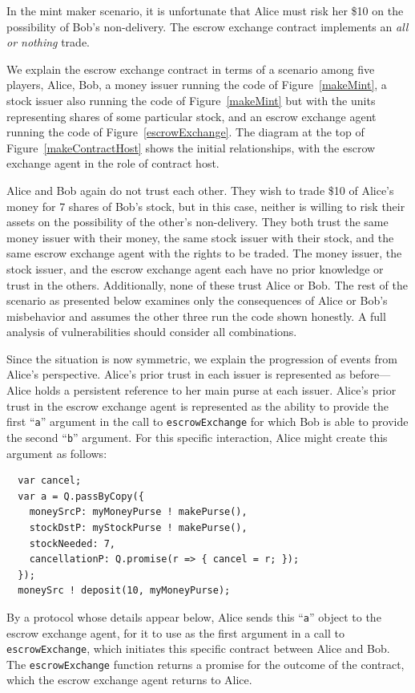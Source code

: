 \documentclass{llncs}
\begin{document}
In the mint maker scenario, it is unfortunate that Alice must risk her \$10 on the possibility of Bob's non-delivery. The escrow exchange contract implements an \emph{all or nothing} trade.

We explain the escrow exchange contract in terms of a scenario among five players, Alice, Bob, a money issuer running the code of Figure~\ref{makeMint}, a stock issuer also running the code of Figure~\ref{makeMint} but with the units representing shares of some particular stock, and an escrow exchange agent running the code of Figure~\ref{escrowExchange}. The diagram at the top of Figure~\ref{makeContractHost} shows the initial relationships, with the escrow exchange agent in the role of contract host.

Alice and Bob again do not trust each other. They wish to trade \$10 of Alice's money for 7 shares of Bob's stock, but in this case, neither is willing to risk their assets on the possibility of the other's non-delivery. They both trust the same money issuer with their money, the same stock issuer with their stock, and the same escrow exchange agent with the rights to be traded. The money issuer, the stock issuer, and the escrow exchange agent each have no prior knowledge or trust in the others. Additionally, none of these trust Alice or Bob. The rest of the scenario as presented below examines only the consequences of Alice or Bob's misbehavior and assumes the other three run the code shown honestly. A full analysis of vulnerabilities should consider all combinations.

Since the situation is now symmetric, we explain the progression of events from Alice's perspective. Alice's prior trust in each issuer is represented as before---Alice holds a persistent reference to her main purse at each issuer. Alice's prior trust in the escrow exchange agent is represented as the ability to provide the first ``{\tt a}'' argument in the call to {\tt escrowExchange} for which Bob is able to provide the second ``{\tt b}'' argument. For this specific interaction, Alice might create this argument as follows:

\begin{verbatim}
  var cancel;
  var a = Q.passByCopy({
    moneySrcP: myMoneyPurse ! makePurse(),
    stockDstP: myStockPurse ! makePurse(),
    stockNeeded: 7,
    cancellationP: Q.promise(r => { cancel = r; });
  });
  moneySrc ! deposit(10, myMoneyPurse);
\end{verbatim}

By a protocol whose details appear below, Alice sends this ``{\tt a}'' object to the escrow exchange agent, for it to use as the first argument in a call to {\tt escrowExchange}, which initiates this specific contract between Alice and Bob. The {\tt escrowExchange} function returns a promise for the outcome of the contract, which the escrow exchange agent returns to Alice. 
\end{document}
